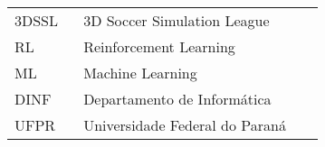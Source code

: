 

\begin{listaacron}

\begin{longtable}[l]{p{0.2\linewidth}p{0.7\linewidth}}
3DSSL & 3D Soccer Simulation League\\
RL & Reinforcement Learning\\
ML & Machine Learning\\
DINF & Departamento de Informática\\
UFPR & Universidade Federal do Paraná\\
\end{longtable}

\end{listaacron}

